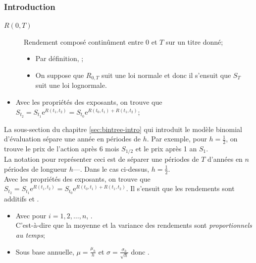 \documentclass[10pt, french]{article}
\begin{document}
\begin{multicols*}{2}
\subsubsection*{Introduction}
\begin{distributions}[Notation]
\begin{description}
	\item[$R(0, T)$]	Rendement composé continûment entre $0$ et $T$ sur un titre donné;
		\begin{itemize}
		\item	Par définition, ;
		\item	On suppose que $R_{0, T}$ suit une loi normale et donc il s'ensuit que $S_{T}$ suit une loi lognormale.
		\end{itemize}
\end{description}
\end{distributions}

\begin{itemize}
	\item	Avec les propriétés des exposants, on trouve que $S_{t_{2}}	=	S_{t_{1}}\textrm{e}^{R(t_{1}, t_{2})}	=	S_{t_{0}}\textrm{e}^{R(t_{0}, t_{1}) + R(t_{1}, t_{2})}$;
\end{itemize}

La sous-section  du chapitre \ref{sec:bintree-intro} qui introduit le modèle binomial d'évaluation sépare une année en périodes de $h$. Par exemple, pour $h	=	\frac{1}{2}$, on trouve le prix de l'action après 6 mois $S_{1/2}$ et le prix après 1 an $S_{1}$. \\

La notation pour représenter ceci est de séparer une périodes de $T$ d'années en $n$ périodes de longueur $h$---. Dans le cas ci-dessus, $h	=	\frac{1}{2}$.\\

Avec les propriétés des exposants, on trouve que $S_{t_{2}}	=	S_{t_{1}}\textrm{e}^{R(t_{1}, t_{2})}	=	S_{t_{0}}\textrm{e}^{R(t_{0}, t_{1}) + R(t_{1}, t_{2})}$. Il s'ensuit que les rendements sont additifs et .

\begin{itemize}
	\item	Avec  pour $i	=	1, 2, \dots, n$, .	\\
			C'est-à-dire que la moyenne et la variance des rendements sont \textit{proportionnels au temps};	
	\item	Sous base annuelle, $\mu =	\frac{\mu_{h}}{h}$ et $\sigma =	\frac{\sigma_{h}}{\sqrt{h}}$ donc .
\end{itemize}


\end{multicols*}
\end{document}
